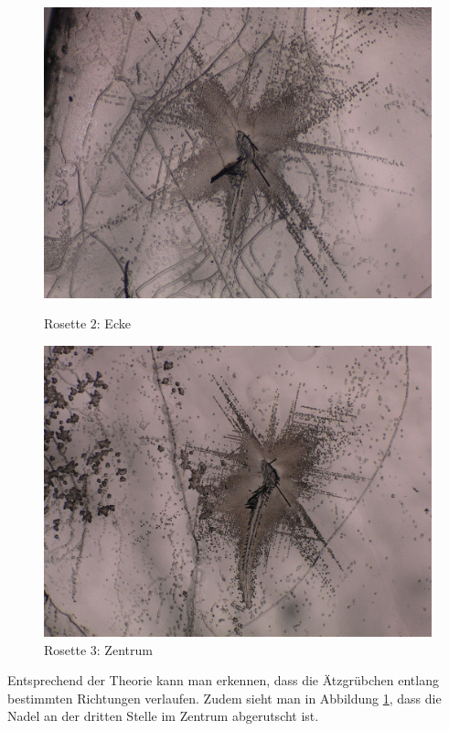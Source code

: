 \documentclass[12pt,a4paper]{scrartcl}
\numberwithin{equation}{section} %
\begin{document}
\begin{figure}[ht]
	\vspace{8pt}
	\begin{minipage}[t]{.5\linewidth}
		\includegraphics[width=\textwidth]{../media/B2.8/Rosetten_2.pdf}
		\caption{Rosette $2$: Ecke}
		\label{abb:Rosetten 2}
	\end{minipage}
	\begin{minipage}[t]{.5\linewidth}
	\includegraphics[width=\textwidth]{../media/B2.8/Rosetten_3.pdf}
	\caption{Rosette $3$: Zentrum}
	\label{abb:Rosetten 3}
\end{minipage}
\end{figure}

Entsprechend der Theorie kann man erkennen, dass die Ätzgrübchen entlang bestimmten Richtungen verlaufen. Zudem sieht man in Abbildung \ref{abb:Rosetten 3}, dass die Nadel an der dritten Stelle im Zentrum abgerutscht ist.
\end{document}

